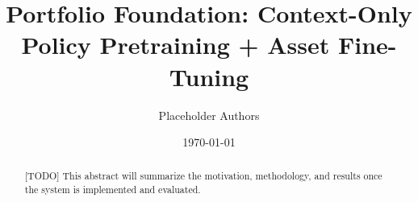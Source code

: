 \documentclass[11pt]{article}
\title{Portfolio Foundation: Context-Only Policy Pretraining + Asset Fine-Tuning}
\author{Placeholder Authors}
\date{\today}
\begin{document}
\maketitle

\begin{abstract}
[TODO] This abstract will summarize the motivation, methodology, and results once the system is implemented and evaluated.
\end{abstract}










\end{document}
